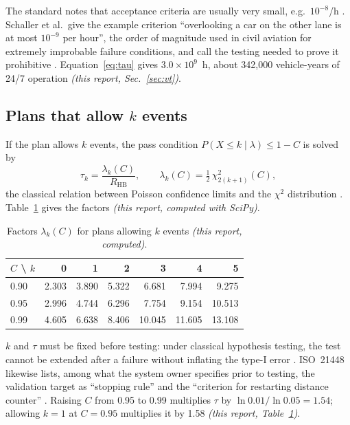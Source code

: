 \documentclass[11pt,a4paper]{article}
\newcommand{\own}[1]{\textit{(this report, #1)}}
\newcommand{\RHB}{R_{\mathrm{HB}}}
\begin{document}
The standard notes that acceptance criteria are usually very small, e.g.\ $10^{-8}$/h \cite[C.2.1, p.~126]{iso21448}. Schaller et al.\ give the example criterion ``overlooking a car on the other lane is at most $10^{-9}$ per hour'', the order of magnitude used in civil aviation for extremely improbable failure conditions, and call the testing needed to prove it prohibitive \cite[Sec.~5.1, p.~14]{schaller2026}. Equation~\eqref{eq:tau} gives $3.0\times10^{9}$~h, about 342{,}000 vehicle-years of 24/7 operation \own{Sec.~\ref{sec:vt}}.

\subsection{Plans that allow \texorpdfstring{$k$}{k} events}
If the plan allows $k$ events, the pass condition $P(X\le k\mid\lambda)\le 1-C$ is solved by
\begin{equation}
\tau_k = \frac{\lambda_k(C)}{\RHB},\qquad \lambda_k(C)=\tfrac12\,\chi^2_{2(k+1)}(C),
\label{eq:chi2}
\end{equation}
the classical relation between Poisson confidence limits and the $\chi^2$ distribution \cite[location not verified]{garwood1936}. Table~\ref{tab:lambda} gives the factors \own{computed with SciPy}.

\begin{table}[H]
\centering\small
\caption{Factors $\lambda_k(C)$ for plans allowing $k$ events \own{computed}.}
\label{tab:lambda}
\begin{tabular}{lrrrrrr}
\toprule
$C$ \textbackslash{} $k$ & 0 & 1 & 2 & 3 & 4 & 5\\
\midrule
0.90 & 2.303 & 3.890 & 5.322 & 6.681 & 7.994 & 9.275\\
0.95 & 2.996 & 4.744 & 6.296 & 7.754 & 9.154 & 10.513\\
0.99 & 4.605 & 6.638 & 8.406 & 10.045 & 11.605 & 13.108\\
\bottomrule
\end{tabular}
\end{table}

$k$ and $\tau$ must be fixed before testing: under classical hypothesis testing, the test cannot be extended after a failure without inflating the type-I error \cite[Sec.~III-C, item~6]{betschinske2025}. ISO~21448 likewise lists, among what the system owner specifies prior to testing, the validation target as ``stopping rule'' and the ``criterion for restarting distance counter'' \cite[C.3, p.~136]{iso21448}. Raising $C$ from 0.95 to 0.99 multiplies $\tau$ by $\ln 0.01/\ln 0.05 = 1.54$; allowing $k=1$ at $C=0.95$ multiplies it by 1.58 \own{Table~\ref{tab:lambda}}.
\end{document}
